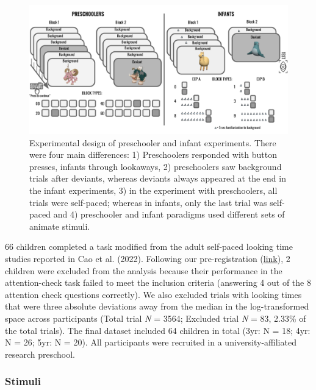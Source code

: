 \documentclass[10pt, letterpaper]{article}
\newenvironment{CodeChunk}{}{}
\begin{document}
\begin{CodeChunk}
\begin{figure}[h]

{\centering \includegraphics{figs/experimental_design-1} 

}

\caption[Experimental design of preschooler and infant experiments]{Experimental design of preschooler and infant experiments. There were four main differences: 1) Preschoolers responded with button presses, infants through lookaways, 2) preschoolers saw background trials after deviants, whereas deviants always appeared at the end in the infant experiments, 3) in the experiment with preschoolers, all trials were self-paced; whereas in infants, only the last trial was self-paced and 4) preschooler and infant paradigms used different sets of animate stimuli.}\label{fig:experimental_design}
\end{figure}
\end{CodeChunk}

66 children completed a task modified from the adult self-paced looking
time studies reported in Cao et al. (2022). Following our
pre-registration
(\href{https://aspredicted.org/blind.php?x=5WQ_YQH}{link}), 2 children
were excluded from the analysis because their performance in the
attention-check task failed to meet the inclusion criteria (answering 4
out of the 8 attention check questions correctly). We also excluded
trials with looking times that were three absolute deviations away from
the median in the log-transformed space across participants (Total trial
\emph{N} = 3564; Excluded trial \emph{N} = 83, 2.33\% of the total
trials). The final dataset included 64 children in total (3yr: N = 18;
4yr: N = 26; 5yr: N = 20). All participants were recruited in a
university-affiliated research preschool.

\hypertarget{stimuli}{%
\subsubsection{Stimuli}\label{stimuli}}
\end{document}
